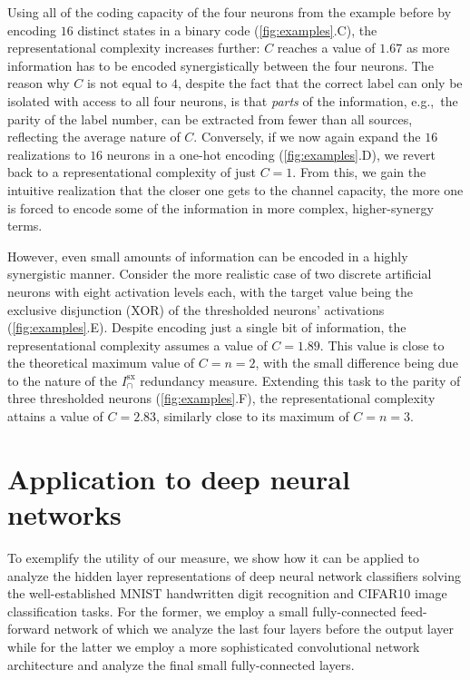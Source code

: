 \documentclass[10pt]{article}
\renewcommand\autoref[1]{\cref{#1}}
\theoremstyle{definition}
\theoremstyle{plain}
\begin{document}
Using all of the coding capacity of the four neurons from the example before by encoding $16$ distinct states in a binary code (\autoref{fig:examples}.C), the representational complexity increases further: $C$ reaches a value of $1.67$ as more information has to be encoded synergistically between the four neurons. The reason why $C$ is not equal to $4$, despite the fact that the correct label can only be isolated with access to all four neurons, is that \textit{parts} of the information, e.g.,~the parity of the label number, can be extracted from fewer than all sources, reflecting the average nature of $C$. Conversely, if we now again expand the $16$ realizations to $16$ neurons in a one-hot encoding (\autoref{fig:examples}.D), we revert back to a representational complexity of just $C=1$. From this, we gain the intuitive realization that the closer one gets to the channel capacity, the more one is forced to encode some of the information in more complex, higher-synergy terms.

However, even small amounts of information can be encoded in a highly synergistic manner. Consider the more realistic case of two discrete artificial neurons with eight activation levels each, with the target value being the exclusive disjunction (XOR) of the thresholded neurons' activations (\autoref{fig:examples}.E). Despite encoding just a single bit of information, the representational complexity assumes a value of $C=1.89$. This value is close to the theoretical maximum value of $C=n=2$, with the small difference being due to the nature of the $I^{\mathrm{sx}}_\cap$ redundancy measure. Extending this task to the parity of three thresholded neurons (\autoref{fig:examples}.F), the representational complexity attains a value of $C=2.83$, similarly close to its maximum of $C=n=3$.

\section{Application to deep neural networks}

To exemplify the utility of our measure, we show how it can be applied to analyze the hidden layer representations of deep neural network classifiers solving the well-established MNIST \citep{lecun_gradient-based_1998} handwritten digit recognition  and CIFAR10 \citep{krizhevsky2009learning} image classification tasks. For the former, we employ a small fully-connected feed-forward network of which we analyze the last four layers before the output layer while for the latter we employ a more sophisticated convolutional network architecture and analyze the final small fully-connected layers.
\end{document}
